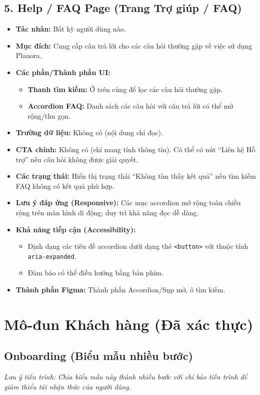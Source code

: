 \documentclass[11pt,a4paper]{article}
\begin{document}
\subsection{5. Help / FAQ Page (Trang Trợ giúp / FAQ)}
\begin{itemize}
    \item \textbf{Tác nhân:} Bất kỳ người dùng nào.
    \item \textbf{Mục đích:} Cung cấp câu trả lời cho các câu hỏi thường gặp về việc sử dụng Planora.
    \item \textbf{Các phần/Thành phần UI:}
    \begin{itemize}
        \item \textbf{Thanh tìm kiếm:} Ở trên cùng để lọc các câu hỏi thường gặp.
        \item \textbf{Accordion FAQ:} Danh sách các câu hỏi với câu trả lời có thể mở rộng/thu gọn.
    \end{itemize}
    \item \textbf{Trường dữ liệu:} Không có (nội dung chỉ đọc).
    \item \textbf{CTA chính:} Không có (chỉ mang tính thông tin). Có thể có nút ``Liên hệ Hỗ trợ'' nếu câu hỏi không được giải quyết.
    \item \textbf{Các trạng thái:} Hiển thị trạng thái ``Không tìm thấy kết quả'' nếu tìm kiếm FAQ không có kết quả phù hợp.
    \item \textbf{Lưu ý đáp ứng (Responsive):} Các mục accordion mở rộng toàn chiều rộng trên màn hình di động; duy trì khả năng đọc dễ dàng.
    \item \textbf{Khả năng tiếp cận (Accessibility):}
    \begin{itemize}
        \item Định dạng các tiêu đề accordion dưới dạng thẻ \texttt{<button>} với thuộc tính \texttt{aria-expanded}.
        \item Đảm bảo có thể điều hướng bằng bàn phím.
    \end{itemize}
    \item \textbf{Thành phần Figma:} Thành phần Accordion/Sụp mở, ô tìm kiếm.
\end{itemize}

\section{Mô-đun Khách hàng (Đã xác thực)}

\subsection{Onboarding (Biểu mẫu nhiều bước)}
\textit{Lưu ý tiến trình: Chia biểu mẫu này thành nhiều bước với chỉ báo tiến trình để giảm thiểu tải nhận thức của người dùng.}
\end{document}

